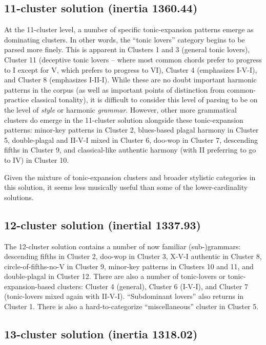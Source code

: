 \subsection{11-cluster solution (inertia 1360.44)}
\label{11-clustersolutioninertia1360.44}

At the 11-cluster level, a number of specific tonic-expansion patterns emerge as dominating clusters. In other words, the ``tonic lovers'' category begins to be parsed more finely. This is apparent in Clusters 1 and 3 (general tonic lovers), Cluster 11 (deceptive tonic lovers -- where most common chords prefer to progress to I except for V, which prefers to progress to VI), Cluster 4 (emphasizes I-V-I), and Cluster 8 (emphasizes I-II-I). While these are no doubt important harmonic patterns in the corpus (as well as important points of distinction from common-practice classical tonality), it is difficult to consider this level of parsing to be on the level of \emph{style} or harmonic \emph{grammar}. However, other more grammatical clusters do emerge in the 11-cluster solution alongside these tonic-expansion patterns: minor-key patterns in Cluster 2, blues-based plagal harmony in Cluster 5, double-plagal and II-V-I mixed in Cluster 6, doo-wop in Cluster 7, descending fifths in Cluster 9, and classical-like authentic harmony (with II preferring to go to IV) in Cluster 10.

Given the mixture of tonic-expansion clusters and broader stylistic categories in this solution, it seems less musically useful than some of the lower-cardinality solutions.

\subsection{12-cluster solution (inertial 1337.93)}
\label{12-clustersolutioninertial1337.93}

The 12-cluster solution contains a number of now familiar (sub-)grammars: descending fifths in Cluster 2, doo-wop in Cluster 3, X-V-I authentic in Cluster 8, circle-of-fifths-no-V in Cluster 9, minor-key patterns in Clusters 10 and 11, and double-plagal in Cluster 12. There are also a number of tonic-lovers or tonic-expansion-based clusters: Cluster 4 (general), Cluster 6 (I-V-I), and Cluster 7 (tonic-lovers mixed again with II-V-I). ``Subdominant lovers'' also returns in Cluster 1. There is also a hard-to-categorize ``miscellaneous'' cluster in Cluster 5.

\subsection{13-cluster solution (inertia 1318.02)}
\label{13-clustersolutioninertia1318.02}

